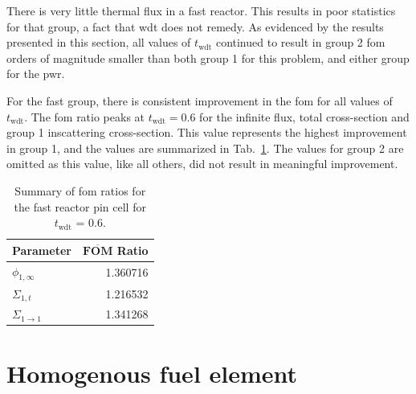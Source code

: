 There is very little thermal flux in a fast reactor. This results in
poor statistics for that group, a fact that \gls{wdt} does not
remedy. As evidenced by the results presented in this section, all
values of $t_{\mathrm{wdt}}$ continued to result in group 2 \gls{fom} orders
of magnitude smaller than both group 1 for this problem, and either
group for the \gls{pwr}.

For the fast group, there is consistent improvement in the \gls{fom}
for all values of $t_{\mathrm{wdt}}$. The \gls{fom} ratio peaks at
$t_{\mathrm{wdt}} = 0.6$ for the infinite flux, total cross-section
and group 1 inscattering cross-section. This value represents the
highest improvement in group 1, and the values are summarized in
Tab.~\ref{tab:fast_discussion}. The values for group 2 are omitted as
this value, like all others, did not result in meaningful improvement.

\begin{table}[hbtp]
  \centering
  \caption{Summary of \acrshort{fom} ratios for the fast reactor pin
  cell for $t_{\mathrm{wdt}}$ = 0.6.}
  \begin{tabular}{lr}\toprule
    \textbf{Parameter}& $\overline{\mathbf{FOM}}$ \textbf{Ratio} \\ \midrule
    $\phi_{1, \infty}$ & 1.360716 \\
    $\Sigma_{1,t}$ & 1.216532 \\
    $\Sigma_{1 \to 1}$ & 1.341268 \\ \bottomrule
  \end{tabular}
  \label{tab:fast_discussion}
\end{table}


\newpage
\section{Homogenous fuel element}
\label{sec:homog}


